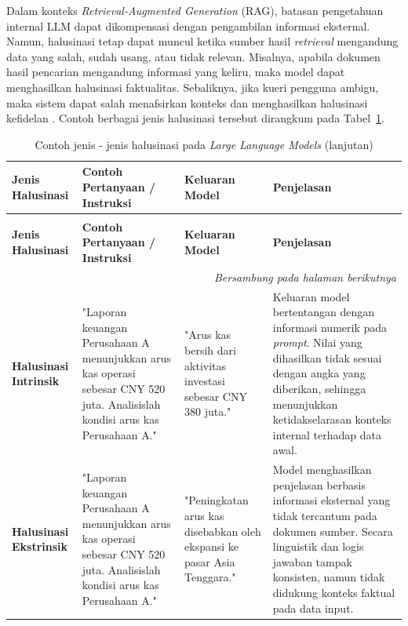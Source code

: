 Dalam konteks
\textit{Retrieval-Augmented Generation} (RAG), batasan pengetahuan internal LLM dapat dikompensasi dengan pengambilan informasi eksternal. Namun, halusinasi tetap dapat muncul ketika sumber hasil \textit{retrieval} mengandung data yang salah, sudah usang, atau tidak relevan. Misalnya, apabila dokumen hasil pencarian mengandung informasi yang keliru, maka model dapat menghasilkan halusinasi faktualitas. Sebaliknya, jika kueri pengguna ambigu, maka sistem dapat salah menafsirkan konteks dan menghasilkan halusinasi kefidelan \parencite{math2024hallucination}. Contoh berbagai jenis halusinasi tersebut dirangkum pada Tabel~\ref{tbl:jenis_hallucination_baru}.

\begin{longtable}{|p{2cm}|p{2.5cm}|p{3.5cm}|p{4cm}|}
\caption{Contoh berbagai jenis halusinasi pada \textit{Large Language Models (LLM)}}
\label{tbl:jenis_hallucination_baru} \\
\hline
\textbf{Jenis Halusinasi} &
\textbf{Contoh Pertanyaan / Instruksi} &
\textbf{Keluaran Model} &
\textbf{Penjelasan} \\
\hline
\endfirsthead

\caption[]{Contoh jenis - jenis halusinasi pada \textit{Large Language Models} (lanjutan)} \\
\hline
\textbf{Jenis Halusinasi} &
\textbf{Contoh Pertanyaan / Instruksi} &
\textbf{Keluaran Model} &
\textbf{Penjelasan} \\
\hline
\endhead

\hline
\multicolumn{4}{r}{\textit{Bersambung pada halaman berikutnya}} \\
\endfoot

\hline
\endlastfoot


\textbf{Halusinasi Intrinsik} &
"Laporan keuangan Perusahaan A menunjukkan arus kas operasi sebesar CNY 520 juta. Analisislah kondisi arus kas Perusahaan A." &
"Arus kas bersih dari aktivitas investasi sebesar CNY 380 juta." &
Keluaran model bertentangan dengan informasi numerik pada \textit{prompt}. Nilai yang dihasilkan tidak sesuai dengan angka yang diberikan, sehingga menunjukkan ketidakselarasan konteks internal terhadap data awal. \\ \hline

\textbf{Halusinasi Ekstrinsik} &
"Laporan keuangan Perusahaan A menunjukkan arus kas operasi sebesar CNY 520 juta. Analisislah kondisi arus kas Perusahaan A." &
"Peningkatan arus kas disebabkan oleh ekspansi ke pasar Asia Tenggara." &
Model menghasilkan penjelasan berbasis informasi eksternal yang tidak tercantum pada dokumen sumber. Secara linguistik dan logis jawaban tampak konsisten, namun tidak didukung konteks faktual pada data input. \\ \hline


\end{longtable}
